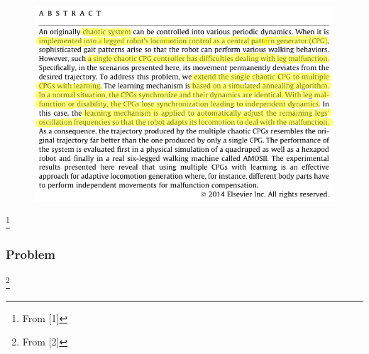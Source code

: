 \documentclass{beamer}
\begin{document}
\begin{frame}
\begin{figure}
\center
\includegraphics[width=1\textwidth]{figs/abstract-a.pdf}
\end{figure}
\footnote{From [1]}
\end{frame}

\begin{frame}

\frametitle{Problem}
\begin{figure}
\center
{}
\end{figure}
\footnote{From [2]}
\end{frame}
\end{document}
